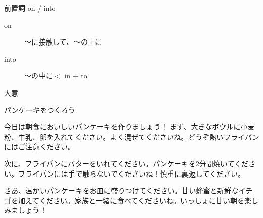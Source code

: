\documentclass[aspectratio=169,xcolor={dvipsnames,table}]{beamer}
\begin{document}
\begin{frame}[plain]{前置詞 on / into}
  \begin{description}
    \item[on] ～に接触して、～の上に
    \item[into] ～の中に\hfill{}{$<$ in $+$ to}
  \end{description}
\end{frame}
\begin{frame}[plain]{大意}

  パンケーキをつくろう

  \smallskip

  {\setlength{\parindent}{1\zw}
    今日は朝食においしいパンケーキを作りましょう！
    まず、大きなボウルに小麦粉、牛乳、卵を入れてください。よく混ぜてくださいね。どうぞ熱いフライパンにはご注意ください。

    次に、フライパンにバターをいれてください。パンケーキを2分間焼いてください。フライパンには手で触らないでくださいね！慎重に裏返してください。

    さあ、温かいパンケーキをお皿に盛りつけてください。甘い蜂蜜と新鮮なイチゴを加えてください。家族と一緒に食べてくださいね。いっしょに甘い朝を楽しみましょう！}
\end{frame}
\end{document}
